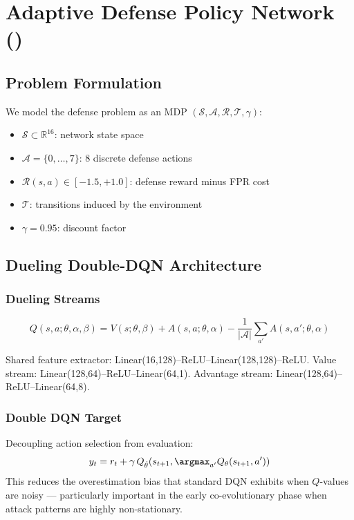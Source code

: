 \chapter{Adaptive Defense Policy Network (\adpn{})}
\label{ch:adpn}

\section{Problem Formulation}

We model the defense problem as an MDP
$(\mathcal{S}, \mathcal{A}, \mathcal{R}, \mathcal{T}, \gamma)$:
\begin{itemize}
  \item $\mathcal{S} \subset \mathbb{R}^{16}$: network state space
  \item $\mathcal{A} = \{0,\ldots,7\}$: 8 discrete defense actions
  \item $\mathcal{R}(s,a) \in [-1.5, +1.0]$: defense reward minus FPR cost
  \item $\mathcal{T}$: transitions induced by the \caesar{} environment
  \item $\gamma = 0.95$: discount factor
\end{itemize}

\section{Dueling Double-DQN Architecture}

\subsection{Dueling Streams}
\begin{equation}
  Q(s,a;\theta,\alpha,\beta) = V(s;\theta,\beta)
    + A(s,a;\theta,\alpha)
    - \frac{1}{|\mathcal{A}|}\sum_{a'} A(s,a';\theta,\alpha)
\end{equation}

Shared feature extractor: Linear(16,128)--ReLU--Linear(128,128)--ReLU.
Value stream: Linear(128,64)--ReLU--Linear(64,1).
Advantage stream: Linear(128,64)--ReLU--Linear(64,8).

\subsection{Double DQN Target}
Decoupling action selection from evaluation:
\begin{equation}
  y_t = r_t + \gamma\, Q_{\hat\theta}\!\left(s_{t+1},
    \argmax_{a'} Q_\theta(s_{t+1},a')\right)
\end{equation}
This reduces the overestimation bias that standard DQN exhibits when
$Q$-values are noisy — particularly important in the early co-evolutionary
phase when attack patterns are highly non-stationary.

